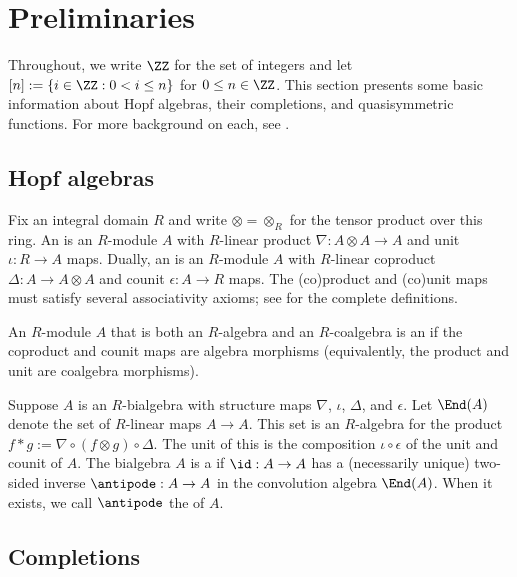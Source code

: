  

 

\section{Preliminaries}\label{prelim-sect}

Throughout, we write $\ZZ$ for the set of integers
and let $[n] := \{i \in \ZZ : 0<i \leq n\}$ for $0\leq n \in \ZZ$.
This section presents some basic information about Hopf algebras, their completions,
and quasisymmetric functions.
For more background on each, see \cite{GrinbergReiner,LMW,Marberg2018}.

\subsection{Hopf algebras}

Fix an integral domain $R$ and write $\otimes = \otimes_R$ for the tensor product over this ring.
An  is an $R$-module $A$ with $R$-linear
product $\nabla : A\otimes A \to A$
and unit $\iota : R\to A$ 
maps.
Dually, an  is an $R$-module $A$ with $R$-linear 
coproduct $\Delta : A \to A\otimes A$
and 
counit $\epsilon : A \to R$ maps.
 The (co)product and (co)unit maps must satisfy several associativity axioms;
see \cite[\S1]{GrinbergReiner} for the complete definitions.


An $R$-module $A$ that is both an $R$-algebra and an $R$-coalgebra is an 
if the coproduct and counit maps are algebra morphisms (equivalently, the product and unit are coalgebra morphisms).

Suppose $A$ is an $R$-bialgebra with structure maps $\nabla$, $\iota$, $\Delta$, and $\epsilon$. 
Let $\End(A)$ denote the set of $R$-linear maps $A \to A$. This set is an $R$-algebra for the 
product 
$
f \ast g := \nabla \circ (f\otimes g) \circ \Delta
$. 
The unit of this 
is the composition $ \iota\circ \epsilon$ of the unit and counit of $A$.
The bialgebra $A$ is a  if  $\id : A \to A$ has a
(necessarily unique) two-sided inverse 
$\antipode : A \to A$ in the convolution algebra $\End(A)$. When it exists, we call $\antipode$ the  of $A$.

\subsection{Completions}\label{completions-sect}

